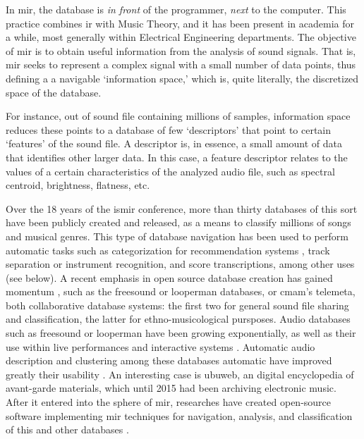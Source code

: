 
In \gls{mir}, the database is \textit{in front} of the programmer, \textit{next} to the computer. This practice combines \gls{ir} with Music Theory, and it has been present in academia for a while, most generally within Electrical Engineering departments. The objective of \gls{mir} is to obtain useful information from the analysis of sound signals. That is, \gls{mir} seeks to represent a complex signal with a small number of data points, thus defining a a navigable `information space,' which is, quite literally, the discretized space of the database.


For instance, out of sound file containing millions of samples, information space reduces these points to a database of few `descriptors' that point to certain `features' of the sound file. A descriptor is, in essence, a small amount of data that identifies other larger data. In this case, a feature descriptor relates to the values of a certain characteristics of the analyzed audio file, such as spectral centroid, brightness, flatness, etc. 

Over the 18 years of the \gls{ismir} conference, more than thirty databases of this sort have been publicly created and released, as a means to classify millions of songs and musical genres. This type of database navigation has been used to perform automatic tasks such as categorization for recommendation systems \parencite{DBLP:journals/corr/abs-0812-4235, asmita_poddar_2018_1422565}, track separation or instrument recognition, and score transcriptions, among other uses (see below). A recent emphasis in open source database creation has gained momentum \parencite{DBLP:conf/ismir/FonsecaPFFBFOPS17}, such as the \gls{freesound} or \gls{looperman} databases, or \gls{cmam}'s \gls{telemeta}, both collaborative database systems: the first two for general sound file sharing and classification, the latter for ethno-musicological pursposes. Audio databases such as \gls{freesound} or \gls{looperman} have been growing exponentially, as well as their use within live performances and interactive systems \parencite{nuno_n_correia_2010_849729}. Automatic audio description and clustering among these databases automatic have improved greatly their usability \parencite{gerard_roma_2012_850102}. An interesting case is \gls{ubuweb}, an digital encyclopedia of avant-garde materials, which until 2015 had been archiving electronic music. After it entered into the sphere of \gls{mir}, researches have created open-source software implementing \gls{mir} techniques for navigation, analysis, and classification of this and other databases \parencite{collins_2015}.



